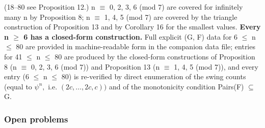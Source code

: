 \documentclass[
]{article}
\begin{document}
(18--80 see Proposition 12.) n \(\equiv\) 0, 2, 3, 6 (mod 7) are covered
for infinitely many n by Proposition 8; n \(\equiv\) 1, 4, 5 (mod 7) are
covered by the triangle construction of Proposition 13 and by Corollary
16 for the smallest values. \textbf{Every n \(\ge\) 6 has a closed-form
construction.} Full explicit (G, F) data for 6 \(\le\) n \(\le\) 80 are
provided in machine-readable form in the companion data file; entries
for 41 \(\le\) n \(\le\) 80 are produced by the closed-form
constructions of Proposition 8 (n \(\equiv\) 0, 2, 3, 6 (mod 7)) and
Proposition 13 (n \(\equiv\) 1, 4, 5 (mod 7)), and every entry (6
\(\le\) n \(\le\) 80) is re-verified by direct enumeration of the swing
counts (equal to \(\psi^n,\) i.e. \((2c,\dots,2c,c))\) and of the
monotonicity condition Pairs(F) \(\subseteq\) G.

\subsubsection{Open problems}\label{open-problems}
\end{document}
